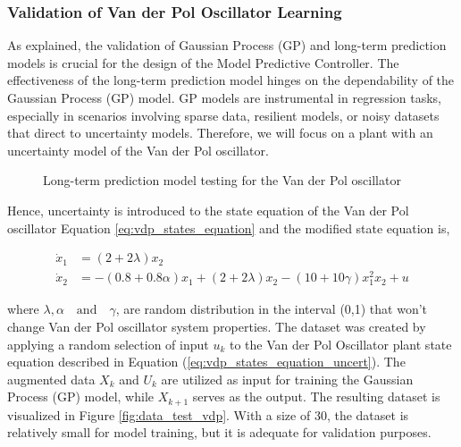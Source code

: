 \subsubsection{Validation of Van der Pol Oscillator Learning}
As explained, the validation of Gaussian Process (GP) and long-term prediction models is crucial for the design of the Model Predictive Controller. The effectiveness of the long-term prediction model hinges on the dependability of the Gaussian Process (GP) model. GP models are instrumental in regression tasks, especially in scenarios involving sparse data, resilient models, or noisy datasets that direct to uncertainty models. Therefore, we will focus on a plant with an uncertainty model of the Van der Pol oscillator.

\begin{figure}
    \centering
    
    \caption{Long-term prediction model testing for the Van der Pol oscillator}
    \label{fig:long_term__vdp}
\end{figure}



Hence, uncertainty is introduced to the state equation of the Van der Pol oscillator Equation \ref{eq:vdp_states_equation} and the modified state equation is,

\begin{equation}\label{eq:vdp_states_equation_uncert}
    \begin{aligned}
        \dot{x}_1 &= (2+2\lambda)x_2 \\
        \dot{x}_2 &= -(0.8+0.8 \alpha)x_1 + (2+2 \lambda)x_2 - (10+10\gamma)x_1^2x_2 + u
\end{aligned}
\end{equation}

where $\lambda, \alpha \quad \text{and} \quad \gamma$, are random distribution
in the interval (0,1) that won't change Van der Pol oscillator system properties. The dataset was created by applying a random selection of input \( u_k \) to the Van der Pol Oscillator plant state equation described in Equation (\ref{eq:vdp_states_equation_uncert}). The augmented data \( X_k \) and \( U_k \) are utilized as input for training the Gaussian Process (GP) model, while \( X_{k+1} \) serves as the output. The resulting dataset is visualized in Figure \ref{fig:data_test_vdp}. With a size of 30, the dataset is relatively small for model training, but it is adequate for validation purposes.




